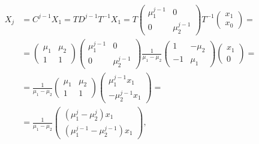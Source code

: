 \documentclass[english, parskip=full]{scrartcl}
\begin{document}
\begin{align}
X_{j} &= C^{j-1} X_1 = TD^{j-1}T^{-1} X_1 = T\begin{pmatrix}
\mu_1^{j-1} & 0 \\ 0 & \mu_2^{j-1}
\end{pmatrix} T^{-1} \begin{pmatrix}
x_1 \\ x_0
\end{pmatrix} = \\
&= \begin{pmatrix}
\mu_1 & \mu_2 \\ 1 & 1
\end{pmatrix} \begin{pmatrix}
\mu_1^{j-1} & 0 \\ 0 & \mu_2^{j-1}
\end{pmatrix} \frac{1}{\mu_1 - \mu_2} \begin{pmatrix}
1 & -\mu_2 \\ -1 & \mu_1
\end{pmatrix} \begin{pmatrix}
x_1 \\ 0
\end{pmatrix} = \\
&= \frac{1}{\mu_1 - \mu_2} \begin{pmatrix}
\mu_1 & \mu_2 \\ 1 & 1
\end{pmatrix} \begin{pmatrix}
\mu_1^{j-1} x_1 \\ -\mu_2^{j-1} x_1
\end{pmatrix} = \\
&= \frac{1}{\mu_1 - \mu_2} \begin{pmatrix}
(\mu_1^j - \mu_2^j)x_1 \\ (\mu_1^{j-1} - \mu_2^{j-1})x_1
\end{pmatrix},
\end{align}
\end{document}

